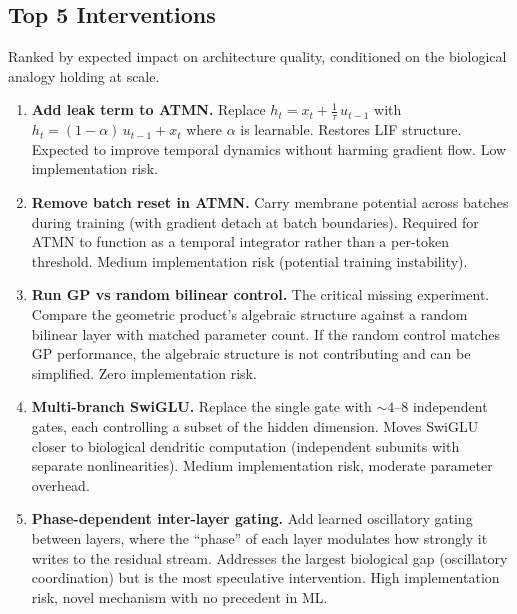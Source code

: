 \documentclass[11pt,a4paper]{article}
\begin{document}
\subsection{Top 5 Interventions}

Ranked by expected impact on architecture quality, conditioned on the biological analogy holding at scale.

\begin{enumerate}

\item \textbf{Add leak term to ATMN.} Replace $h_t = x_t + \frac{1}{\tau}\, u_{t-1}$ with $h_t = (1 - \alpha)\, u_{t-1} + x_t$ where $\alpha$ is learnable. Restores LIF structure. Expected to improve temporal dynamics without harming gradient flow. Low implementation risk.

\item \textbf{Remove batch reset in ATMN.} Carry membrane potential across batches during training (with gradient detach at batch boundaries). Required for ATMN to function as a temporal integrator rather than a per-token threshold. Medium implementation risk (potential training instability).

\item \textbf{Run GP vs random bilinear control.} The critical missing experiment. Compare the geometric product's algebraic structure against a random bilinear layer with matched parameter count. If the random control matches GP performance, the algebraic structure is not contributing and can be simplified. Zero implementation risk.

\item \textbf{Multi-branch SwiGLU.} Replace the single gate with ${\sim}4\text{--}8$ independent gates, each controlling a subset of the hidden dimension. Moves SwiGLU closer to biological dendritic computation (independent subunits with separate nonlinearities). Medium implementation risk, moderate parameter overhead.

\item \textbf{Phase-dependent inter-layer gating.} Add learned oscillatory gating between layers, where the ``phase'' of each layer modulates how strongly it writes to the residual stream. Addresses the largest biological gap (oscillatory coordination) but is the most speculative intervention. High implementation risk, novel mechanism with no precedent in ML.

\end{enumerate}
\end{document}
